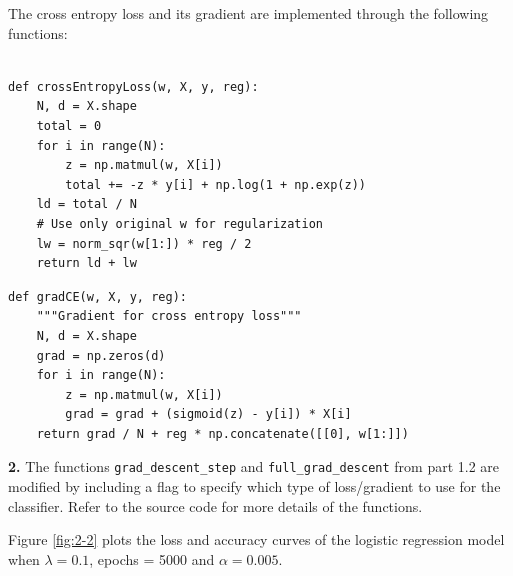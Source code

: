 \documentclass[12pt]{article}
\newenvironment{problem}[2][Problem]{\begin{trivlist}
\item[\hskip \labelsep {\bfseries #1}\hskip \labelsep {\bfseries #2.}]}{\end{trivlist}}
\begin{document}
\begin{problem}{2}
\bigskip
The cross entropy loss and its gradient are implemented through the following functions:
\begin{lstlisting}[frame=single]

def crossEntropyLoss(w, X, y, reg):
    N, d = X.shape
    total = 0
    for i in range(N):
        z = np.matmul(w, X[i])
        total += -z * y[i] + np.log(1 + np.exp(z))
    ld = total / N
    # Use only original w for regularization
    lw = norm_sqr(w[1:]) * reg / 2
    return ld + lw
\end{lstlisting}

\begin{lstlisting}[frame=single]
def gradCE(w, X, y, reg):
    """Gradient for cross entropy loss"""
    N, d = X.shape
    grad = np.zeros(d)
    for i in range(N):
        z = np.matmul(w, X[i])
        grad = grad + (sigmoid(z) - y[i]) * X[i]
    return grad / N + reg * np.concatenate([[0], w[1:]])
\end{lstlisting}

\bigskip
\textbf{2. } The functions 
\texttt{grad\_descent\_step} and  \texttt{full\_grad\_descent} from part 1.2 are modified by including a flag to specify which type of loss/gradient to use for the classifier. Refer to the source code for more details of the functions. 

\bigskip
Figure \ref{fig:2-2} plots the loss and accuracy curves of the logistic regression model when $\lambda=0.1$, epochs = 5000 and $\alpha=0.005$. 


\end{problem}
\end{document}
